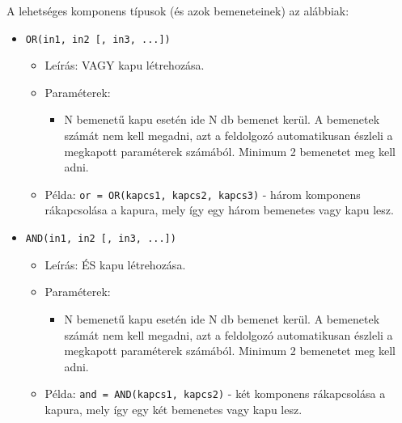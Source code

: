 A lehetséges komponens típusok (és azok bemeneteinek) az alábbiak:
\begin{itemize}
			
\item \texttt{OR(in1, in2 [, in3, ...])}
	\begin{itemize}
	\item Leírás: VAGY kapu létrehozása.
	\item Paraméterek: 
		\begin{itemize}
			\item N bemenetű kapu esetén ide N db bemenet kerül. A bemenetek számát nem kell megadni, azt a feldolgozó automatikusan észleli a megkapott paraméterek számából. Minimum 2 bemenetet meg kell adni.
		\end{itemize}
	\item Példa: \texttt{or = OR(kapcs1, kapcs2, kapcs3)} - három komponens rákapcsolása a kapura, mely így egy három bemenetes vagy kapu lesz.
	\end{itemize}

\item \texttt{AND(in1, in2 [, in3, ...])}
	\begin{itemize}
	\item Leírás: ÉS kapu létrehozása.
	\item Paraméterek: 
		\begin{itemize}
			\item N bemenetű kapu esetén ide N db bemenet kerül. A bemenetek számát nem kell megadni, azt a feldolgozó automatikusan észleli a megkapott paraméterek számából. Minimum 2 bemenetet meg kell adni.
		\end{itemize}
	\item Példa: \texttt{and = AND(kapcs1, kapcs2)} - két komponens rákapcsolása a kapura, mely így egy két bemenetes vagy kapu lesz.
	\end{itemize}
	

\end{itemize}
